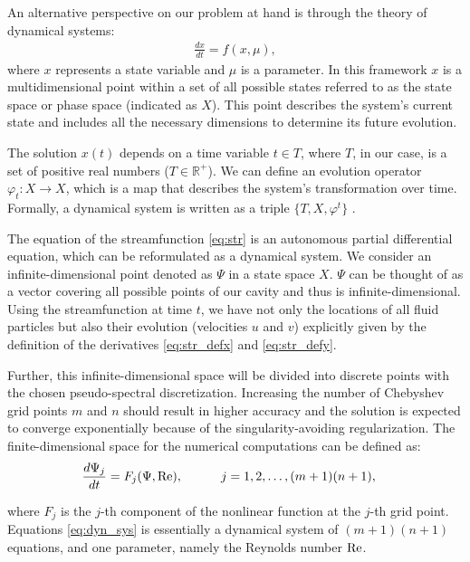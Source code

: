 An alternative perspective on our problem at hand is through the theory of
dynamical systems:
\begin{align}
  \frac{dx}{dt} = {f(x, \mu)}, \label{eq:dyn_sys_orig}
\end{align}
where $x$ represents a state variable and $\mu$ is a parameter. In this
framework $x$ is a multidimensional point within a set of all possible states
referred to as the state space or phase space (indicated as $X$). This point
describes the system's current state and includes all the necessary dimensions
to determine its future evolution.

The solution $x(t)$ depends on a time variable $t \in T$, where $T$, in our
case, is a set of positive real numbers ($T \in \mathbb{R}^+$). We can define
an evolution operator $\varphi_t : X \to X$, which is a map that describes the
system's transformation over time. Formally, a dynamical system is written as a
triple $\{ T, X, \varphi^t \}$ \citep{kuznetsov2004}.

The equation of the streamfunction \eqref{eq:str} is an autonomous partial
differential equation, which can be reformulated as a dynamical system. We
consider an infinite-dimensional point denoted as $\Psi$ in a state space $X$.
$\Psi$ can be thought of as a vector covering all possible points of our cavity
and thus is infinite-dimensional. Using the streamfunction at time $t$, we have
not only the locations of all fluid particles but also their evolution
(velocities $u$ and $v$) explicitly given by the definition of the derivatives
\eqref{eq:str_defx} and \eqref{eq:str_defy}.

Further, this infinite-dimensional space will be divided into discrete points
with the chosen pseudo-spectral discretization. Increasing the number of
Chebyshev grid points $m$ and $n$ should result in higher accuracy and the
solution is expected to converge exponentially because of the
singularity-avoiding regularization. The finite-dimensional space for the
numerical computations can be defined as:
\begin{align}
  \frac{d\Psi_j}{dt} &= {F_j(\Psi, \mathrm{Re})}, \quad \quad \quad
    j= 1,2,\dots,(m+1)(n+1), \label{eq:dyn_sys}
\end{align}

where $F_j$ is the $j$-th component of the nonlinear function at the $j$-{th}
grid point. Equations \eqref{eq:dyn_sys} is essentially a dynamical system of
$(m+1)(n+1)$ equations, and one parameter, namely the Reynolds number $\mathrm{Re}$.

